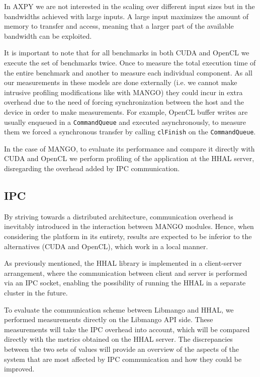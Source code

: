 In AXPY we are not interested in the scaling over different input sizes but in the bandwidths achieved with large inputs. A large input maximizes the amount of memory to transfer and access, meaning that a larger part of the available bandwidth can be exploited.

It is important to note that for all benchmarks in both CUDA and OpenCL we execute the set of benchmarks twice. Once to measure the total execution time of the entire benchmark and another to measure each individual component. As all our measurements in these models are done externally (i.e. we cannot make intrusive profiling modifications like with MANGO) they could incur in extra overhead due to the need of forcing synchronization between the host and the device in order to make measurements. For example, OpenCL buffer writes are usually enqueued in a \texttt{CommandQueue} and executed asynchronously, to measure them we forced a synchronous transfer by calling \texttt{clFinish} on the \texttt{CommandQueue}.

In the case of MANGO, to evaluate its performance and compare it directly with CUDA and OpenCL we perform profiling of the application at the HHAL server, disregarding the overhead added by IPC communication. 

\subsection{IPC}

By striving towards a distributed architecture, communication overhead is inevitably introduced in the interaction between MANGO modules. Hence, when considering the platform in its entirety, results are expected to be inferior to the alternatives (CUDA and OpenCL), which work in a local manner.

As previously mentioned, the HHAL library is implemented in a client-server arrangement, where the communication between client and server is performed via an IPC socket, enabling the possibility of running the HHAL in a separate cluster in the future. 

To evaluate the communication scheme between Libmango and HHAL, we performed measurements directly on the Libmango API side. These measurements will take the IPC overhead into account, which will be compared directly with the metrics obtained on the HHAL server. The discrepancies between the two sets of values will provide an overview of the aspects of the system that are most affected by IPC communication and how they could be improved.

